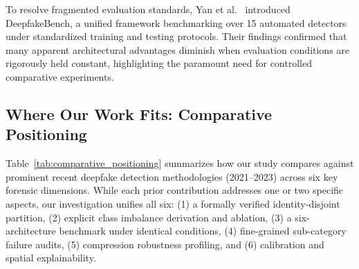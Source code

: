 \documentclass[conference]{IEEEtran}
\begin{document}
To resolve fragmented evaluation standards, Yan et al.\ \cite{yan2023deepfakebench} introduced DeepfakeBench, a unified framework benchmarking over 15 automated detectors under standardized training and testing protocols. Their findings confirmed that many apparent architectural advantages diminish when evaluation conditions are rigorously held constant, highlighting the paramount need for controlled comparative experiments.

\subsection{Where Our Work Fits: Comparative Positioning}

Table~\ref{tab:comparative_positioning} summarizes how our study compares against prominent recent deepfake detection methodologies (2021--2023) across six key forensic dimensions. While each prior contribution addresses one or two specific aspects, our investigation unifies all six: (1) a formally verified identity-disjoint partition, (2) explicit class imbalance derivation and ablation, (3) a six-architecture benchmark under identical conditions, (4) fine-grained sub-category failure audits, (5) compression robustness profiling, and (6) calibration and spatial explainability.
\end{document}
